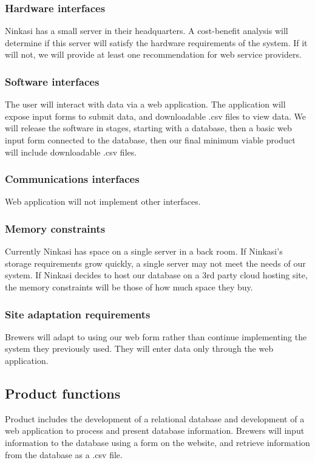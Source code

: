 \documentclass[draftclsnofoot,onecolumn,letterpaper,10pt,compsoc]{IEEEtran}
\begin{document}
		\subsubsection{Hardware interfaces}
			Ninkasi has a small server in their headquarters.
			A cost-benefit analysis will determine if this server will satisfy the hardware requirements of the system.
			If it will not, we will provide at least one recommendation for web service providers.

		\subsubsection{Software interfaces}
			The user will interact with data via a web application.
			The application will expose input forms to submit data, and downloadable .csv files to view data.
			We will release the software in stages, starting with a database, then a basic web input form connected to the database, then our final minimum viable product will include downloadable .csv files.

		\subsubsection{Communications interfaces}
			Web application will not implement other interfaces.

		\subsubsection{Memory constraints}
			Currently Ninkasi has space on a single server in a back room.
			If Ninkasi's storage requirements grow quickly, a single server may not meet the needs of our system.
			If Ninkasi decides to host our database on a 3rd party cloud hosting site, the memory constraints will be those of how much space they buy.

		\subsubsection{Site adaptation requirements}
			Brewers will adapt to using our web form rather than continue implementing the system they previously used.
			They will enter data only through the web application.

	\subsection{Product functions}
		Product includes the development of a relational database and development of a web application to process and present database information.
		Brewers will input information to the database using a form on the website, and retrieve information from the database as a .csv file.
\end{document}
